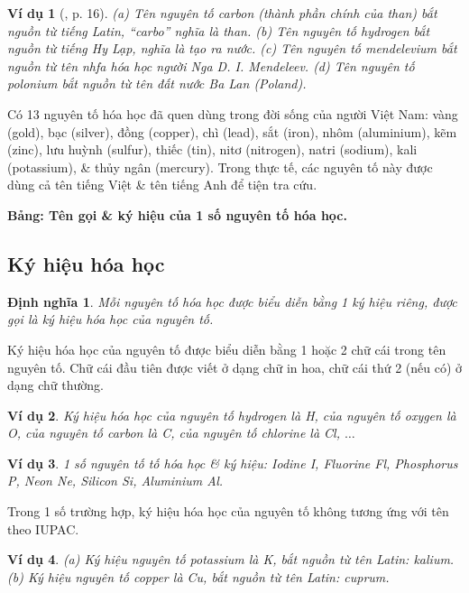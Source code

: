 \documentclass{article}
\newtheorem{dinhnghia}{Định nghĩa}
\newtheorem{vidu}{Ví dụ}
\begin{document}
\begin{vidu}[\cite{SGK_KHTN_7_Canh_Dieu}, p. 16]
	(a) Tên nguyên tố carbon (thành phần chính của than) bắt nguồn từ tiếng Latin, ``carbo'' nghĩa là than. (b) Tên nguyên tố hydrogen bắt nguồn từ tiếng Hy Lạp, nghĩa là tạo ra nước. (c) Tên nguyên tố mendelevium bắt nguồn từ tên nhfa hóa học người Nga D. I. Mendeleev. (d) Tên nguyên tố polonium bắt nguồn từ tên đất nước Ba Lan (Poland).
\end{vidu}
Có 13 nguyên tố hóa học đã quen dùng trong đời sống của người Việt Nam: vàng (gold), bạc (silver), đồng (copper), chì (lead), sắt (iron), nhôm (aluminium), kẽm (zinc), lưu huỳnh (sulfur), thiếc (tin), nitơ (nitrogen), natri (sodium), kali (potassium), \& thủy ngân (mercury). Trong thực tế, các nguyên tố này được dùng cả tên tiếng Việt \& tên tiếng Anh để tiện tra cứu.

\textbf{Bảng: Tên gọi \& ký hiệu của 1 số nguyên tố hóa học.}

\subsection{Ký hiệu hóa học}

\begin{dinhnghia}
	Mỗi nguyên tố hóa học được biểu diễn bằng 1 ký hiệu riêng, được gọi là \emph{ký hiệu hóa học của nguyên tố}.
\end{dinhnghia}
Ký hiệu hóa học của nguyên tố được biểu diễn bằng 1 hoặc 2 chữ cái trong tên nguyên tố. Chữ cái đầu tiên được viết ở dạng chữ in hoa, chữ cái thứ 2 (nếu có) ở dạng chữ thường.

\begin{vidu}
	Ký hiệu hóa học của nguyên tố hydrogen là \emph{H}, của nguyên tố oxygen là \emph{O}, của nguyên tố carbon là \emph{C}, của nguyên tố chlorine là \emph{Cl}, $\ldots$
\end{vidu}

\begin{vidu}
	1 số nguyên tố tố hóa học \& ký hiệu: Iodine \emph{I}, Fluorine \emph{Fl}, Phosphorus \emph{P}, Neon \emph{Ne}, Silicon \emph{Si}, Aluminium \emph{Al}.
\end{vidu}
Trong 1 số trường hợp, ký hiệu hóa học của nguyên tố không tương ứng với tên theo IUPAC.

\begin{vidu}
	(a) Ký hiệu nguyên tố potassium là \emph{K}, bắt nguồn từ tên Latin: kalium. (b) Ký hiệu nguyên tố copper là \emph{Cu}, bắt nguồn từ tên Latin: cuprum.
\end{vidu}
\noindent{}
\end{document}
